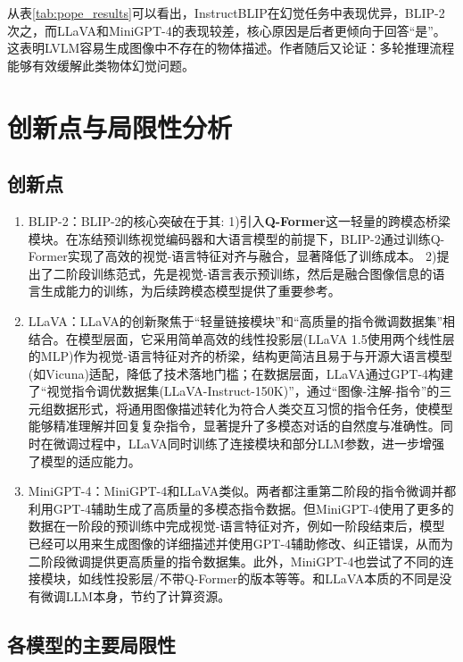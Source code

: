 \documentclass{article}
\begin{document}
从表\ref{tab:pope_results}可以看出，InstructBLIP在幻觉任务中表现优异，BLIP-2次之，而LLaVA和MiniGPT-4的表现较差，核心原因是后者更倾向于回答“是”。这表明LVLM容易生成图像中不存在的物体描述。作者随后又论证：多轮推理流程能够有效缓解此类物体幻觉问题。



\newpage

\section{创新点与局限性分析}\label{ux4e09ux7ed3ux8bba}
\subsection{创新点}

\begin{enumerate}
\def\labelenumi{\arabic{enumi}.}
\item
  BLIP-2：BLIP-2的核心突破在于其: 1)引入\textbf{Q-Former}这一轻量的跨模态桥梁模块。在冻结预训练视觉编码器和大语言模型的前提下，BLIP-2通过训练Q-Former实现了高效的视觉-语言特征对齐与融合，显著降低了训练成本。 2)提出了二阶段训练范式，先是视觉-语言表示预训练，然后是融合图像信息的语言生成能力的训练，为后续跨模态模型提供了重要参考。
\item
  LLaVA：LLaVA的创新聚焦于``轻量链接模块''和``高质量的指令微调数据集''相结合。在模型层面，它采用简单高效的线性投影层(LLaVA 1.5使用两个线性层的MLP)作为视觉-语言特征对齐的桥梁，结构更简洁且易于与开源大语言模型(如Vicuna)适配，降低了技术落地门槛；在数据层面，LLaVA通过GPT-4构建了``视觉指令调优数据集(LLaVA-Instruct-150K)''，通过``图像-注解-指令''的三元组数据形式，将通用图像描述转化为符合人类交互习惯的指令任务，使模型能够精准理解并回复复杂指令，显著提升了多模态对话的自然度与准确性。同时在微调过程中，LLaVA同时训练了连接模块和部分LLM参数，进一步增强了模型的适应能力。
\item
  MiniGPT-4：MiniGPT-4和LLaVA类似。两者都注重第二阶段的指令微调并都利用GPT-4辅助生成了高质量的多模态指令数据。但MiniGPT-4使用了更多的数据在一阶段的预训练中完成视觉-语言特征对齐，例如一阶段结束后，模型已经可以用来生成图像的详细描述并使用GPT-4辅助修改、纠正错误，从而为二阶段微调提供更高质量的指令数据集。此外，MiniGPT-4也尝试了不同的连接模块，如线性投影层/不带Q-Former的版本等等。和LLaVA本质的不同是没有微调LLM本身，节约了计算资源。
\end{enumerate}

\subsection{各模型的主要局限性}
\end{document}

